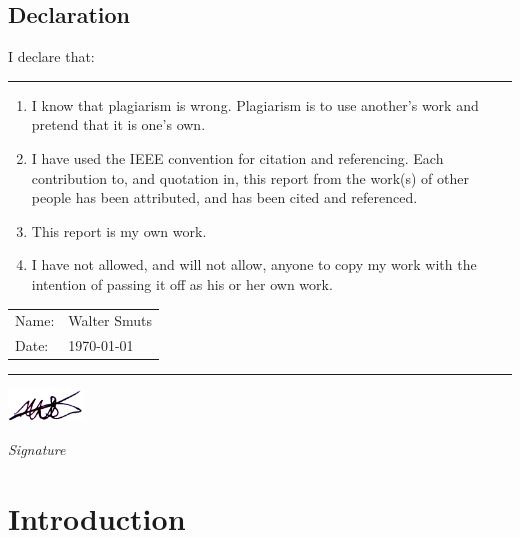\documentclass[12pt, twoside, openright]{report}
\begin{document}
\vfill
\vfill

\newpage
\null
\vfill

\section*{\center Declaration}
\thispagestyle{plain}

I declare that:
\vspace{3mm}
\hrule
\begin{enumerate}
\item
I know that plagiarism is wrong. Plagiarism is to use another’s work and
pretend that it is one’s own.
\item
I have used the IEEE convention for citation and referencing. Each contribution
to, and quotation in, this report from the work(s) of other people has been
attributed, and has been cited and referenced.
\item
This report is my own work.
\item
I have not allowed, and will not allow, anyone to copy my work with the
intention of passing it off as his or her own work.
\end{enumerate}

\begin{tabular}{ l l }
 Name: &  Walter Smuts\\
 Date: & \today
\end{tabular}
\vspace{3mm}
\hrule
\vspace{3mm}
\includegraphics[width=2cm]{Signature.png}
\par {\it Signature}

\vfill
\vfill

{\small\tableofcontents}
\thispagestyle{plain}


\chapter{Introduction}
\setcounter{page}{1}

\end{document}
